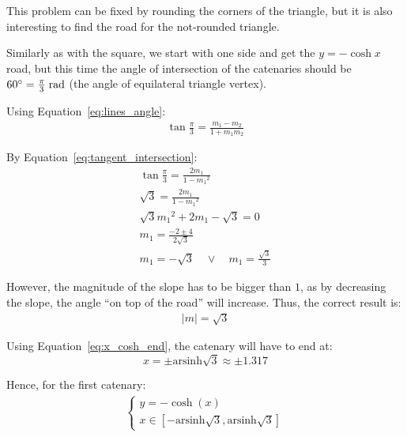 \documentclass[12pt]{article}
\begin{document}
        This problem can be fixed by rounding the corners of the triangle, but it is also interesting to find the road for the not-rounded triangle.

        Similarly as with the square, we start with one side and get the $y= -\cosh x$ road, but this time the angle of intersection of the catenaries should be $60\degree = \frac{\pi}{3} \;\text{rad}$ (the angle of equilateral triangle vertex).

        Using Equation~\ref{eq:lines_angle}:
        \begin{align}
            \tan \frac{\pi}{3} = \frac{m_1 - m_2}{1 + m_1 m_2}
        \end{align}

        By Equation~\ref{eq:tangent_intersection}:
        \begin{align}
            \tan \frac{\pi}{3} = \frac{2 m_1}{1 - {m_1}^2} \\
            \sqrt{3} = \frac{2 m_1}{1 - {m_1}^2} \\
            \sqrt{3} {m_1}^2 + 2 m_1 - \sqrt{3} = 0 \\
            m_1 = \frac{-2 \pm 4}{2 \sqrt{3}} \\
            m_1 = - \sqrt{3} \quad \lor \quad m_1 = \frac{\sqrt{3}}{3}
        \end{align}

        However, the magnitude of the slope has to be bigger than $1$, as by decreasing the slope, the angle ``on top of the road'' will increase. Thus, the correct result is:
        \begin{align*}
            |m| = \sqrt{3}
        \end{align*}

        Using Equation~\ref{eq:x_cosh_end}, the catenary will have to end at:
        \begin{equation}
            x = \pm \text{arsinh}\sqrt{3} \approx \pm 1.317
        \end{equation}

        Hence, for the first catenary:
        \begin{align}
            \begin{cases}
                y = -\cosh(x) \\
                x \in [-\text{arsinh}\sqrt{3}, \text{arsinh}\sqrt{3}]
            \end{cases}
        \end{align}
\end{document}
